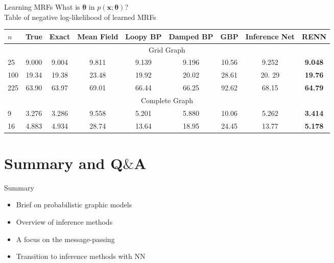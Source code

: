 \documentclass[xcolor=x11names,compress]{beamer}
\begin{document}
\begin{frame}
  {Learning MRFs}
  What is $\bm{\theta}$ in $p(\bm{x};\bm{\theta})$?\\
  Table of negative log-likelihood of learned MRFs \\
  \begin{adjustbox}{width=1\textwidth}
    \begin{tabular}{lcccccccc}
      \toprule
      $n$ & True & Exact & Mean Field & Loopy BP & Damped BP & GBP & Inference Net & RENN \\
      \toprule
      \multicolumn{9}{c}{Grid Graph}\\
      \midrule
      25  &  9.000  &  9.004  &  9.811  &  {9.139}  &  9.196  &  10.56  &  9.252  &  \textbf{9.048}  \\
      100 &  19.34  &  19.38  &  23.48  &  {19.92}  &  20.02  &  28.61  &  20. 29  &  \textbf{19.76} \\
      225 &  63.90  &  63.97  &  69.01  &  66.44    &  66.25  &  92.62  &  68.15  &  \textbf{64.79}  \\
      \toprule
      \multicolumn{9}{c}{Complete Graph}\\
      \midrule
      9  &  3.276  &  3.286  &  9.558  &  5.201  &  5.880  &  10.06  &  5.262  & \textbf{3.414}  \\
      16  &  4.883  &  4.934  &  28.74  &  13.64  &  18.95  &  24.45  &  13.77  &  \textbf{5.178}  \\

      \bottomrule
    \end{tabular}
  \end{adjustbox}
\end{frame}





\section{Summary and Q$\&$A}
\begin{frame}{Summary}
  \begin{itemize}[label=$\bullet$]
  \item Brief on probabilistic graphic models
  \item Overview of inference methods
  \item A focus on the message-passing
  \item Transition to inference methods with NN
  \end{itemize}
\end{frame}
\end{document}
